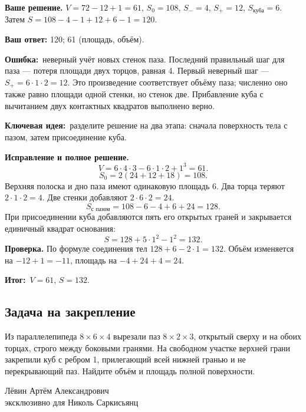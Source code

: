 \documentclass[a4paper,12pt]{article}
\newcommand{\err}{\textcolor{red!70!black}{\textbf{Ошибка:}}}
\newcommand{\idea}{\textcolor{blue!60!black}{\textbf{Ключевая идея:}}}
\newcommand{\result}{\textcolor{teal!60!black}{\textbf{Итог:}}}
\begin{document}
\textbf{Ваше решение.} $V=72-12+1=61$, $S_0=108$, $S_-=4$, $S_+=12$, $S_{\text{куба}}=6$. Затем $S=108-4-1+12+6-1=120$.

\textbf{Ваш ответ:} 120; 61 (площадь, объём).

\err\ неверный учёт новых стенок паза. Последний правильный шаг для паза --- потеря площади двух торцов, равная 4. Первый неверный шаг --- $S_+=6\cdot1\cdot2=12$. Это произведение соответствует объёму паза; численно оно также равно площади одной стенки, но стенок две. Прибавление куба с вычитанием двух контактных квадратов выполнено верно.

\idea\ разделите решение на два этапа: сначала поверхность тела с пазом, затем присоединение куба.

\textbf{Исправление и полное решение.}
\[V=6\cdot4\cdot3-6\cdot1\cdot2+1^3=61.\]
\[S_0=2(24+12+18)=108.\]
Верхняя полоска и дно паза имеют одинаковую площадь 6. Два торца теряют $2\cdot1\cdot2=4$. Две стенки добавляют $2\cdot6\cdot2=24$.
\[S_{\text{с пазом}}=108-6-4+6+24=128.\]
При присоединении куба добавляются пять его открытых граней и закрывается единичный квадрат основания:
\[S=128+5\cdot1^2-1^2=132.\]
\textbf{Проверка.} По формуле соединения тел $128+6-2\cdot1=132$. Объём изменяется на $-12+1=-11$, площадь на $-4+24+4=24$.

\result\ $V=61$, $S=132$.
\subsection*{Задача на закрепление}
Из параллелепипеда $8\times6\times4$ вырезали паз $8\times2\times3$, открытый сверху и на обоих торцах, строго между боковыми гранями. На свободном участке верхней грани закрепили куб с ребром 1, прилегающий всей нижней гранью и не перекрывающий паз. Найдите объём и площадь полной поверхности.

\vfill\begin{center}\small Лёвин Артём Александрович\\эксклюзивно для Николь Саркисьянц\end{center}
\end{document}
